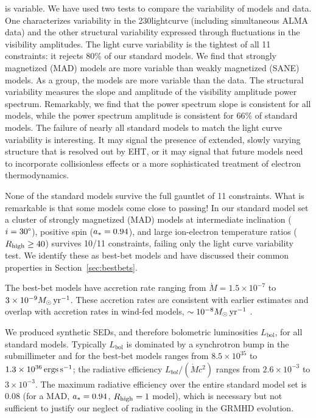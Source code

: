 \sgra is variable.  We have used two tests to compare the variability of models and data. One characterizes variability in the 230\GHz lightcurve (including simultaneous ALMA data) and the other structural variability expressed through fluctuations in the visibility amplitudes.  The light curve variability is the tightest of all 11 constraints: it rejects 80\% of our standard models.  We find that strongly magnetized (MAD) models are more variable than weakly magnetized (SANE) models.  As a group, the models are more variable than the data.  The structural variability measures the slope and amplitude of the visibility amplitude power spectrum.  Remarkably, we find that the power spectrum slope is consistent for all models, while the power spectrum amplitude is consistent for 66\% of standard models.  The failure of nearly all standard models to match the light curve variability is interesting.  It may signal the presence of extended, slowly varying structure that is resolved out by EHT, or it may signal that future models need to incorporate collisionless effects or a more sophisticated treatment of electron thermodynamics.

None of the standard models survive the full gauntlet of 11 constraints.  What is remarkable is that some models come close to passing!  In our standard model set a cluster of strongly magnetized (MAD) models at intermediate inclination ($i = 30\degree$), positive spin ($a_* = 0.94$), and large ion-electron temperature ratios ($R_\mathrm{high} \ge 40$) survives 10/11 constraints, failing only the light curve variability test.  We identify these as best-bet models and have discussed their common properties in Section~\ref{sec:bestbets}.

The best-bet models have accretion rate ranging from $\dot{M} = 1.5 \times 10^{-7}$ to $3 \times 10^{-9} M_\odot\,\mathrm{yr}^{-1}$.  These accretion rates are consistent with earlier estimates and overlap with accretion rates in wind-fed models, $\sim 10^{-8} M_\odot\,\mathrm{yr}^{-1}$ \citep{2020ApJ...896L...6R}.

We produced synthetic SEDs, and therefore bolometric luminosities $L_\mathrm{bol}$, for all standard models.  Typically $L_\mathrm{bol}$ is dominated by a synchrotron bump in the submillimeter and for the best-bet models ranges from $8.5\times10^{35}$ to $1.3\times10^{36}\,\mathrm{ergs\,s^{-1}}$; the radiative efficiency $L_{bol}/(\dot{M} c^2)$ ranges from $2.6\times10^{-3}$ to $3\times10^{-3}$.  The maximum radiative efficiency over the entire standard model set is 0.08 (for a MAD, $a_* = 0.94$, $R_\mathrm{high} = 1$ model), which is necessary but not sufficient to justify our neglect of radiative cooling in the GRMHD evolution.


